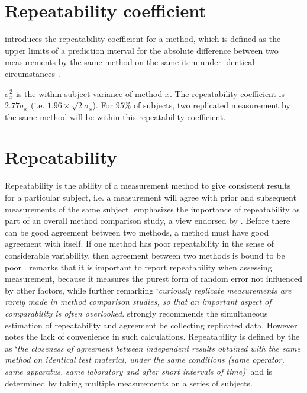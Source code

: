 \documentclass[12pt, a4paper]{report}
\theoremstyle{plain}
\theoremstyle{definition}
\theoremstyle{remark}
\begin{document}
	
	
	
	
	
	
	
	
	
	
	\section{Repeatability coefficient}
	\citet{BA99} introduces the repeatability coefficient for a method, which is defined as the upper limits of a prediction interval for the absolute difference between two measurements by the same
	method on the same item under identical circumstances \citep{BXC2008}.
	
	$\sigma^2_{x}$ is the within-subject variance of method $x$. The repeatability coefficient is $2.77 \sigma_{x}$ (i.e. $1.96 \times \sqrt{2} \sigma_{x}$). For $95\%$ of subjects, two replicated measurement by the same method will be within this repeatability coefficient.
	



		\section{Repeatability}
		Repeatability is the ability of a measurement method to give consistent results for a particular subject, i.e. a measurement will agree with prior and subsequent measurements of the same subject. \citet{Barnhart} emphasizes the importance of repeatability as part of an overall method comparison study, a view endorsed by \citet{BXC2008}. Before there can be good agreement between two methods, a method must have good agreement with itself. If one method has poor repeatability in the sense of considerable
		variability, then agreement between two methods is bound to be
		poor \citep{ARoy2009}. \citet{Barnhart} remarks that it is important to report repeatability when assessing
		measurement, because it measures the purest form of random error
		not influenced by other factors, while further remarking `\textit{curiously replicate measurements are rarely made in method comparison studies, so that an important aspect of comparability is often overlooked}. \citet{BA99} strongly recommends the simultaneous estimation of repeatability and agreement be collecting replicated data.
		However \citet{ARoy2009} notes the lack of convenience in such calculations. 	Repeatability is defined by the \citet{IUPAC} as `\textit{the closeness of agreement between independent results obtained with the same method on identical test material, under the same conditions (same
			operator, same apparatus, same laboratory and after short intervals of time)}'  and is determined by taking multiple measurements on a series of subjects.
		
\end{document}

